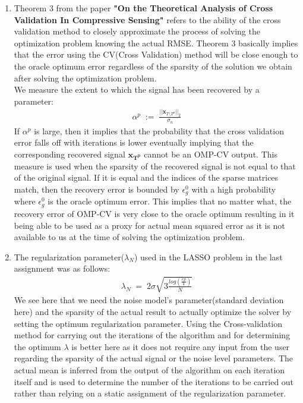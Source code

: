 \documentclass[11pt]{article}
\begin{document}
\begin{enumerate}
\begin{enumerate}
    \item Theorem 3 from the paper \textbf{"On the Theoretical Analysis of Cross Validation In Compressive Sensing"} refers to the ability of the cross validation method to closely approximate the process of solving the optimization problem knowing the actual RMSE. Theorem 3 basically implies that the error using the CV(Cross Validation) method will be close enough to the oracle optimum error regardless of the sparsity of the solution we obtain after solving the optimization problem.\\
    We measure the extent to which the signal has been recovered by a parameter:
    \begin{gather*}
        \alpha^p\;:=\;\frac{||\mathbf{x}_{T\text{\textbackslash} T^p}||_2}{\sigma_n}
    \end{gather*}
    If $\alpha^p$ is large, then it implies that the probability that the cross validation error falls off with iterations is lower eventually implying that the corresponding recovered signal $\mathbf{x_{T^p}}$ cannot be an OMP-CV output. This measure is used when the sparsity of the recovered signal is not equal to that of the original signal. If it is equal and the indices of the sparse matrices match, then the recovery error is bounded by $\epsilon_g^0$ with a high probability where $\epsilon_g^0$ is the oracle optimum error. This implies that no matter what, the recovery error of OMP-CV is very close to the oracle optimum resulting in it being able to be used as a proxy for actual mean squared error as it is not available to us at the time of solving the optimization problem.
    
    \item The regularization parameter($\lambda_N$) used in the LASSO problem in the last assignment was as follows:
    \begin{gather}
        \lambda_N\;=\;2\sigma\sqrt{3\frac{log\left(\frac{ep}{k}\right)}{N}}
    \end{gather}
    We see here that we need the noise model's parameter(standard deviation here) and the sparsity of the actual result to actually optimize the solver by setting the optimum regularization parameter. Using the Cross-validation method for carrying out the iterations of the algorithm and for determining the optimum $\lambda$ is better here as it does not require any input from the user regarding the sparsity of the actual signal or the noise level parameters. The actual mean is inferred from the output of the algorithm on each iteration itself and is used to determine the number of the iterations to be carried out rather than relying on a static assignment of the regularization parameter.
\end{enumerate}




\end{enumerate}
\end{document}
